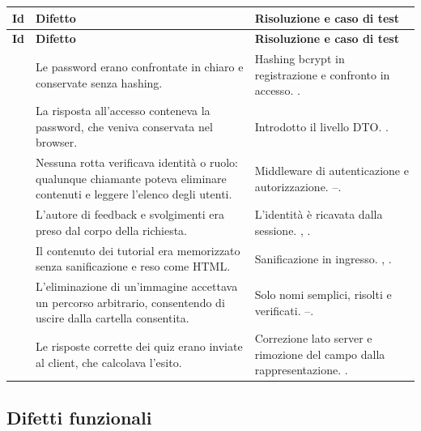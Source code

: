 \begin{longtable}{@{}l L{5.6cm} L{6.4cm}@{}}
\toprule
\textbf{Id} & \textbf{Difetto} & \textbf{Risoluzione e caso di test} \\
\midrule
\endfirsthead
\toprule
\textbf{Id} & \textbf{Difetto} & \textbf{Risoluzione e caso di test} \\
\midrule
\endhead
\bottomrule
\endlastfoot

 &
Le password erano confrontate in chiaro e conservate senza hashing. &
Hashing bcrypt in registrazione e confronto in accesso.
. \\

 &
La risposta all'accesso conteneva la password, che veniva conservata nel
browser. &
Introdotto il livello DTO. . \\

 &
Nessuna rotta verificava identità o ruolo: qualunque chiamante poteva
eliminare contenuti e leggere l'elenco degli utenti. &
Middleware di autenticazione e autorizzazione.
--. \\

 &
L'autore di feedback e svolgimenti era preso dal corpo della richiesta. &
L'identità è ricavata dalla sessione. , . \\

 &
Il contenuto dei tutorial era memorizzato senza sanificazione e reso come
HTML. &
Sanificazione in ingresso. , . \\

 &
L'eliminazione di un'immagine accettava un percorso arbitrario, consentendo
di uscire dalla cartella consentita. &
Solo nomi semplici, risolti e verificati.
--. \\

 &
Le risposte corrette dei quiz erano inviate al client, che calcolava l'esito. &
Correzione lato server e rimozione del campo dalla rappresentazione.
. \\

\end{longtable}

\subsection{Difetti funzionali}

